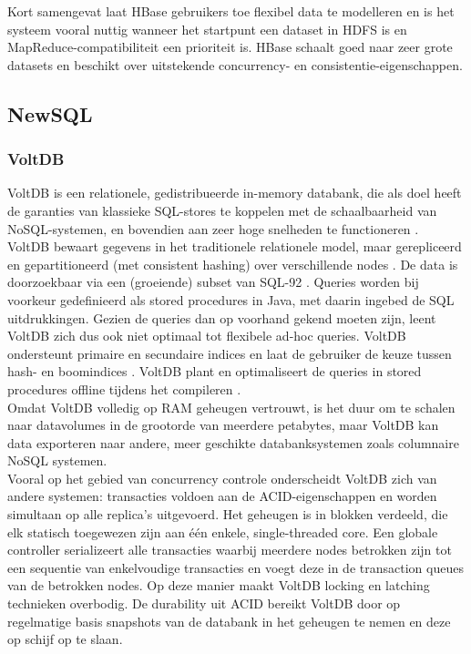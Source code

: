 Kort samengevat laat HBase gebruikers toe flexibel data te modelleren en is het systeem vooral nuttig wanneer het startpunt een dataset in HDFS is en MapReduce-compatibiliteit een prioriteit is. HBase schaalt goed naar zeer grote datasets en beschikt over uitstekende concurrency- en consistentie-eigenschappen.

\subsection{NewSQL} 

\subsubsection{VoltDB}

VoltDB is een relationele, gedistribueerde in-memory databank, die als doel heeft de garanties van klassieke SQL-stores te koppelen met de schaalbaarheid van NoSQL-systemen, en bovendien aan zeer hoge snelheden te functioneren \cite{stonebraker2013voltdb}.\\
VoltDB bewaart gegevens in het traditionele relationele model, maar gerepliceerd en gepartitioneerd (met consistent hashing) over verschillende nodes \cite{grolinger2013data}. De data is doorzoekbaar via een (groeiende) subset van SQL-92 \cite{voltdb2010voltdb}. Queries worden bij voorkeur gedefinieerd als stored procedures in Java, met daarin ingebed de SQL uitdrukkingen. Gezien de queries dan op voorhand gekend moeten zijn, leent VoltDB zich dus ook niet optimaal tot flexibele ad-hoc queries. VoltDB ondersteunt primaire en secundaire indices en laat de gebruiker de keuze tussen hash- en boomindices \cite{voltdb_indexes}. VoltDB plant en optimaliseert de queries in stored procedures offline tijdens het compileren \cite{voltdb_query_plans}.\\
Omdat VoltDB volledig op RAM geheugen vertrouwt, is het duur om te schalen naar datavolumes in de grootorde van meerdere petabytes, maar VoltDB kan data exporteren naar andere, meer geschikte databanksystemen zoals columnaire NoSQL systemen.\\
Vooral op het gebied van concurrency controle onderscheidt VoltDB zich van andere systemen: transacties voldoen aan de ACID-eigenschappen en worden simultaan op alle replica's uitgevoerd. Het geheugen is in blokken verdeeld, die elk statisch toegewezen zijn aan \'e\'en enkele, single-threaded core. Een globale controller serializeert alle transacties waarbij meerdere nodes betrokken zijn tot een sequentie van enkelvoudige transacties en voegt deze in de transaction queues van de betrokken nodes. Op deze manier maakt VoltDB locking en latching technieken overbodig. De durability uit ACID bereikt VoltDB door op regelmatige basis snapshots van de databank in het geheugen te nemen en deze op schijf op te slaan.\\

